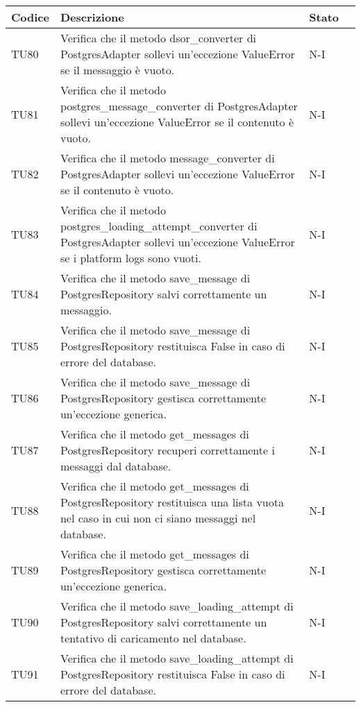 \begin{table}[h!]
    \centering
    \renewcommand{\arraystretch}{1.5}
    \begin{tabularx}{\textwidth}{|p{}|X|p{}|p{}|}\hline
    \rowcolor[HTML]{FFD700}
    \textbf{Codice} & \textbf{Descrizione} & \textbf{Stato} \\ \hline
    TU80 & Verifica che il metodo dsor\_converter di PostgresAdapter sollevi un'eccezione ValueError se il messaggio è vuoto. &  N-I \\ \hline
    TU81 & Verifica che il metodo postgres\_message\_converter di PostgresAdapter sollevi un'eccezione ValueError se il contenuto è vuoto. &  N-I \\ \hline
    TU82 & Verifica che il metodo message\_converter di PostgresAdapter sollevi un'eccezione ValueError se il contenuto è vuoto. &  N-I \\ \hline
    TU83 & Verifica che il metodo postgres\_loading\_attempt\_converter di PostgresAdapter sollevi un'eccezione ValueError se i platform logs sono vuoti. &  N-I \\ \hline
    TU84 & Verifica che il metodo save\_message di PostgresRepository salvi correttamente un messaggio. &  N-I \\ \hline
    TU85 & Verifica che il metodo save\_message di PostgresRepository restituisca False in caso di errore del database. &  N-I \\ \hline
    TU86 & Verifica che il metodo save\_message di PostgresRepository gestisca correttamente un'eccezione generica. &  N-I \\ \hline
    TU87 & Verifica che il metodo get\_messages di PostgresRepository recuperi correttamente i messaggi dal database. &  N-I \\ \hline
    TU88 & Verifica che il metodo get\_messages di PostgresRepository restituisca una lista vuota nel caso in cui non ci siano messaggi nel database.&  N-I \\ \hline
    TU89 & Verifica che il metodo get\_messages di PostgresRepository gestisca correttamente un'eccezione generica. &  N-I \\ \hline
    TU90 & Verifica che il metodo save\_loading\_attempt di PostgresRepository salvi correttamente un tentativo di caricamento nel database. &  N-I \\ \hline
    TU91 & Verifica che il metodo save\_loading\_attempt di PostgresRepository restituisca False in caso di errore del database. &  N-I \\ \hline

\end{tabularx}
\end{table}

